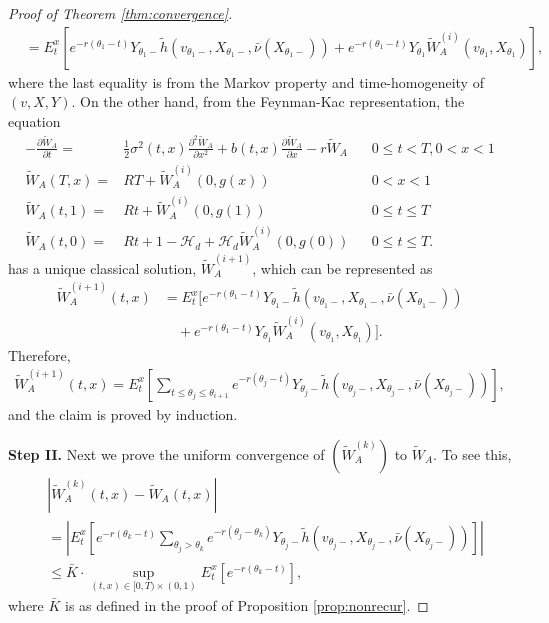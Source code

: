 \documentclass[11pt]{article}%
\numberwithin{equation}{section}
\theoremstyle{plain}
\begin{document}
\begin{appendices}
\begin{proof}[Proof of Theorem \ref{thm:convergence}]
\begin{align*}
		&=E_t^x\left[e^{-r(\theta_{1}-t)}Y_{\theta_{1}-}\tilde{h}(v_{\theta_{1}-},X_{\theta_{1}-},\bar{\nu}(X_{\theta_{1}-}))+e^{-r(\theta_1-t)}Y_{\theta_1}\tilde{W}_A^{(i)}(v_{\theta_1},X_{\theta_1})\right],
	\end{align*}
	where the last equality is from the Markov property and time-homogeneity of $(v,X,Y)$. On the other hand, from the Feynman-Kac representation, the equation
	\begin{align*}
	-\frac{\partial \tilde{W}_{A}}{\partial t}= & \frac{1}{2}\sigma^{2}(t,x)\frac{\partial^{2}\tilde{W}_{A}}{\partial x^{2}}+b(t,x)\frac{\partial \tilde{W}_{A}}{\partial x}-r \tilde{W}_{A} &  & 0\le t<T,0<x<1\\
	\tilde{W}_{A}(T,x)= & RT+\tilde{W}_{A}^{(i)}(0,g(x)) &  & 0<x<1\\
	\tilde{W}_{A}(t,1)= & Rt+\tilde{W}_{A}^{(i)}(0,g(1)) &  & 0\le t\le T\\
	\tilde{W}_{A}(t,0)= & Rt+1-\mathcal{H}_{d}+\mathcal{H}_{d}\tilde{W}_{A}^{(i)}(0,g(0)) &  & 0\le t\le T.
	\end{align*}
	has a unique classical solution, $\tilde{W}_A^{(i+1)}$, which can be represented as
	\begin{align*}
		\tilde{W}_A^{(i+1)}(t,x)&=E_t^x\Bigg[e^{-r(\theta_{1}-t)}Y_{\theta_{1}-}\tilde{h}(v_{\theta_{1}-},X_{\theta_{1}-},\bar{\nu}(X_{\theta_{1}-}))\\
		&\quad+e^{-r(\theta_1-t)}Y_{\theta_1}\tilde{W}_A^{(i)}(v_{\theta_1},X_{\theta_1})\Bigg].
	\end{align*}
	Therefore,
	\begin{align*}
		\tilde{W}_A^{(i+1)}(t,x)=E_t^x\left[\sum_{t\le \theta_j\le \theta_{i+1}}e^{-r(\theta_j-t)}Y_{\theta_j-}\tilde{h}(v_{\theta_j-},X_{\theta_j-},\bar{\nu}(X_{\theta_j-}))\right],
	\end{align*}
	and the claim is proved by induction.

	{\bf Step II.} Next we prove the uniform convergence of $(\tilde{W}_A^{(k)})$ to $\tilde{W}_A$. To see this,
	\begin{align*}
		&|\tilde{W}_A^{(k)}(t,x)-\tilde{W}_A(t,x)|\\
		&=\left|E_t^x\left[e^{-r(\theta_k-t)}\sum_{\theta_j> \theta_{k}}e^{-r(\theta_j-\theta_k)}Y_{\theta_j-}\tilde{h}(v_{\theta_j-},X_{\theta_j-},\bar{\nu}(X_{\theta_j-}))\right]\right|\\
		&\le \bar{K}\cdot \sup_{(t,x)\in[0,T)\times(0,1)}E_t^x\left[e^{-r(\theta_k-t)}\right],
	\end{align*}
	where $\bar{K}$ is as defined in the proof of Proposition \ref{prop:nonrecur}.


\end{proof}
\end{appendices}
\end{document}

